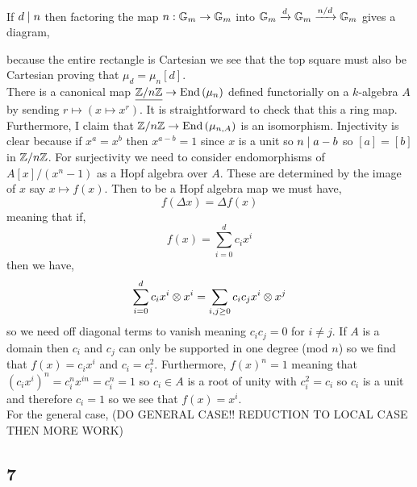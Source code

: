 \documentclass[12pt]{article}
\begin{document}
If $d \mid n$ then factoring the map $n : \mathbb{G}_m \to \mathbb{G}_m$ into $\mathbb{G}_m \xrightarrow{d} \mathbb{G}_m \xrightarrow{n/d} \mathbb{G}_m$ gives a diagram,
\begin{center}
\end{center}
because the entire rectangle is Cartesian we see that the top square must also be Cartesian proving that $\mu_d = \mu_n[d]$.
\bigskip\\
There is a canonical map $\underline{\mathbb{Z}/n\mathbb{Z}} \to \mathrm{End}\left( \mu_n \right)$ defined functorially on a $k$-algebra $A$ by sending $r \mapsto (x \mapsto x^r)$. It is straightforward to check that this a ring map. Furthermore, I claim that $\mathbb{Z} / n \mathbb{Z} \to \mathrm{End}\left( \mu_{n,A} \right)$ is an isomorphism. Injectivity is clear because if $x^a = x^b$ then $x^{a-b} = 1$ since $x$ is a unit so $n \mid a - b$ so $[a] = [b]$ in $\mathbb{Z} / n \mathbb{Z}$. For surjectivity we need to consider endomorphisms of $A[x]/(x^n - 1)$ as a Hopf algebra over $A$. These are determined by the image of $x$ say $x \mapsto f(x)$. Then to be a Hopf algebra map we must have,
\[ f(\Delta x) = \Delta f(x) \]
meaning that if,
\[ f(x) = \sum_{i = 0}^d c_i x^i \]
then we have,
\[ \sum_{i = 0}^d c_i x^i \otimes x^i = \sum_{i,j \ge 0} c_i c_j x^i \otimes x^j \] 
so we need off diagonal terms to vanish meaning $c_i c_j = 0$ for $i \neq j$. If $A$ is a domain then $c_i$ and $c_j$ can only be supported in one degree (mod $n$) so we find that $f(x) = c_i x^i$ and $c_i = c_i^2$. Furthermore, $f(x)^n = 1$ meaning that $(c_i x^i)^n = c_i^n x^{in} = c_i^n = 1$ so $c_i \in A$ is a root of unity with $c_i^2 = c_i$ so $c_i$ is a unit and therefore $c_i = 1$ so we see that $f(x) = x^i$. 
\bigskip\\
For the general case, (DO GENERAL CASE!! REDUCTION TO LOCAL CASE THEN MORE WORK)


\subsection{7}
\end{document}
